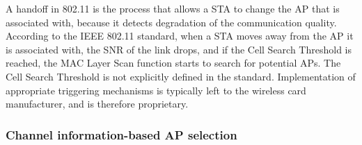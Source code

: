 \documentclass[journal,transmag]{IEEEtran}
\begin{document}
A handoff in 802.11 is the process that allows a STA to change the AP that is associated with, because it detects degradation of the communication quality. According to the IEEE 802.11 standard, when a STA moves away from the AP it is associated with, the SNR of the link drops, and if the Cell Search Threshold is reached, the MAC Layer Scan function starts to search for potential APs. The Cell Search Threshold is not explicitly defined in the standard. Implementation of appropriate triggering mechanisms is typically left to the wireless card manufacturer, and is therefore proprietary. \cite{11contention_traffic_load_aware_association} \\




\subsubsection{Channel information-based AP selection}
\end{document}
